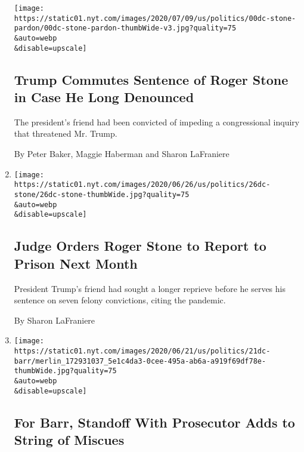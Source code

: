 \begin{enumerate}
  \texttt{[image: https://static01.nyt.com/images/2020/07/09/us/politics/00dc-stone-pardon/00dc-stone-pardon-thumbWide-v3.jpg?quality=75\\\&auto=webp\\\&disable=upscale]}

  \hypertarget{trump-commutes-sentence-of-roger-stone-in-case-he-long-denounced}{%
  \subsection{Trump Commutes Sentence of Roger Stone in Case He Long
  Denounced}\label{trump-commutes-sentence-of-roger-stone-in-case-he-long-denounced}}

  The president's friend had been convicted of impeding a congressional
  inquiry that threatened Mr. Trump.

  By Peter Baker, Maggie Haberman and Sharon LaFraniere
\item
  \href{/2020/06/26/us/politics/roger-stone-prison.html}{}

  \texttt{[image: https://static01.nyt.com/images/2020/06/26/us/politics/26dc-stone/26dc-stone-thumbWide.jpg?quality=75\\\&auto=webp\\\&disable=upscale]}

  \hypertarget{judge-orders-roger-stone-to-report-to-prison-next-month}{%
  \subsection{Judge Orders Roger Stone to Report to Prison Next
  Month}\label{judge-orders-roger-stone-to-report-to-prison-next-month}}

  President Trump's friend had sought a longer reprieve before he serves
  his sentence on seven felony convictions, citing the pandemic.

  By Sharon LaFraniere
\item
  \href{/2020/06/21/us/politics/barr-berman.html}{}

  \texttt{[image: https://static01.nyt.com/images/2020/06/21/us/politics/21dc-barr/merlin\_172931037\_5e1c4da3-0cee-495a-ab6a-a919f69df78e-thumbWide.jpg?quality=75\\\&auto=webp\\\&disable=upscale]}

  \hypertarget{for-barr-standoff-with-prosecutor-adds-to-string-of-miscues}{%
  \subsection{For Barr, Standoff With Prosecutor Adds to String of
  Miscues}\label{for-barr-standoff-with-prosecutor-adds-to-string-of-miscues}}


\end{enumerate}
